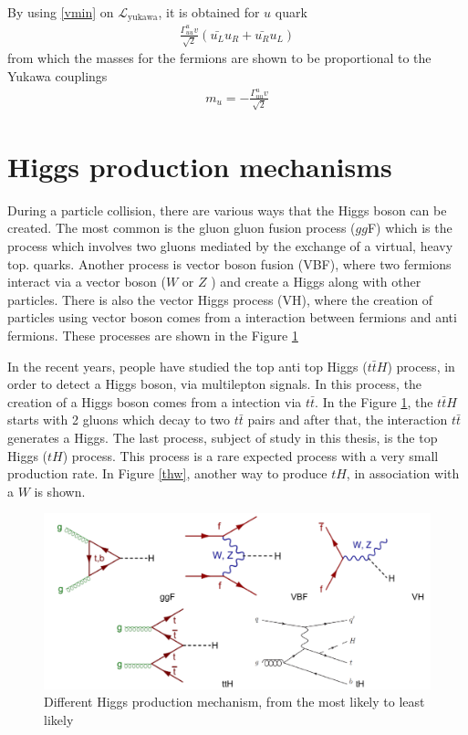 By using \ref{vmin} on $\mathcal{L}_\text{yukawa}$, it is obtained for $u$ quark
\begin{align*}
\frac{\Gamma^u_{uu}v}{\sqrt{2}}(\bar{u_L}u_R+\bar{u_R}u_L)
\end{align*}
from which the masses for the fermions are shown to be proportional to the Yukawa couplings
\begin{align*}
m_u=-\frac{\Gamma^u_{uu}v}{\sqrt{2}}
\end{align*}
 
\pagebreak

\section{Higgs production mechanisms}
During a particle collision, there are various ways that the Higgs boson can be created. The most common is the gluon gluon fusion process ($gg$F) which is the process which involves two gluons mediated by the exchange of a virtual, heavy top.
quarks. Another process is vector boson fusion (VBF), where two fermions interact via a vector boson ($W$ or $Z$ ) and create a Higgs along with other particles. There is also the vector Higgs process (VH), where the creation of particles using vector boson comes from a interaction between fermions and anti fermions\cite{pd}. These processes are shown in the Figure \ref{psu}

In the recent years, people have studied the top anti top Higgs ($t\bar{t}H$) process, in order to detect a Higgs boson, via multilepton signals\cite{th1}.
In this process, the creation of a Higgs boson comes from a intection via $t\bar{t}$. In the Figure \ref{psu}, the $t\bar{t}H$ starts with 2 gluons which decay to two $t\bar{t}$ pairs and after that, the interaction $t\bar{t}$ generates a Higgs. The last process, subject of study in this thesis, is the top Higgs ($tH$) process. This process is a rare expected process with a very small production rate\cite{pd}. In Figure \ref{thw}, another way to produce $tH$, in association with a $W$ is shown.

\begin{figure}[ht]
\centering
\includegraphics[scale=0.5]{Chapter1/pg.png}
\caption[Higgs production mechanism]{Different Higgs production mechanism, from the most likely to least likely \cite{gamma}\cite{timo}}
\label{psu}
\end{figure}


